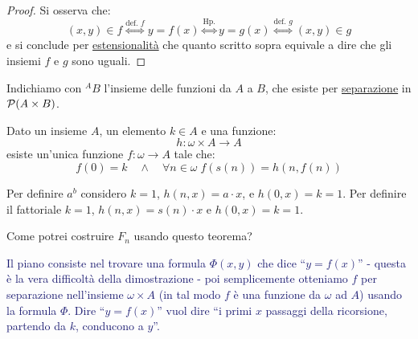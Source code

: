 \begin{proof}
	Si osserva che:
	\[ (x,y) \in f \overset{\text{def. $f$}}{\iff} y = f(x) \overset{\text{Hp.}}{\iff} y = g(x) \overset{\text{def. $g$}}{\iff} (x,y) \in g
		\]
	e si conclude per \hyperref[ax2]{estensionalità} che quanto scritto sopra equivale a dire che gli insiemi $f$ e $g$ sono uguali.
\end{proof}

\begin{notation}
	Indichiamo con ${}^{A}B$ l'insieme delle funzioni da $A$ a $B$, che esiste per \hyperref[ax3]{separazione} in $\mathcal{P}(A \times B)$.
\end{notation}

\begin{theorem}
	\label{ric1}
	Dato un insieme $A$, un elemento $k \in A$ e una funzione:
	\[ h : \omega \times A \rightarrow A
		\]
	esiste un'unica funzione $f : \omega \rightarrow A$ tale che:
	\[ f(0) = k \quad \land \quad \forall n \in \omega\; f(s(n)) = h(n,f(n))
		\]
\end{theorem}

\begin{example}
	Per definire $a^b$ considero $k = 1$, $h(n,x) = a \cdot x$, e $h(0,x) = k = 1$. Per definire il fattoriale $k = 1$, $h(n,x) = s(n) \cdot x$ e $h(0,x) = k = 1$.
\end{example}

\begin{exercise}
	Come potrei costruire $F_n$ usando questo teorema?
\end{exercise}

\textcolor{MidnightBlue}{Il piano consiste nel trovare una formula $\Phi(x,y)$ che dice ``$y = f(x)$'' - questa è la vera difficoltà 
della dimostrazione - poi semplicemente otteniamo $f$ per separazione nell'insieme $\omega \times A$ (in tal modo $f$ è una funzione da $\omega$ ad $A$) usando la formula $\Phi$.
Dire ``$y = f(x)$'' vuol dire ``i primi $x$ passaggi della ricorsione, partendo da $k$, conducono a $y$''.}

